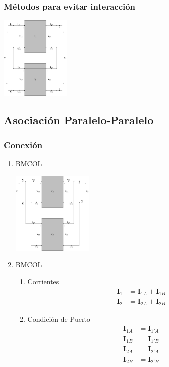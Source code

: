 \subsubsection{Métodos para evitar interacción}
\label{sec:org7265967}
\begin{center}
\includegraphics[height=4cm]{../figs/serie-serie-corto.pdf}
\end{center}

\subsection{Asociación Paralelo-Paralelo}
\label{sec:org3afa958}
\subsubsection{Conexión}
\label{sec:org39169d7}
\begin{enumerate}
\item \hfill{}\textsc{BMCOL}
\label{sec:org8edd165}
\begin{center}
\includegraphics[height=4cm]{../figs/paralelo-paralelo.pdf}
\end{center}
\item \hfill{}\textsc{BMCOL}
\label{sec:orgc8c6f3c}
\begin{enumerate}
\item Corrientes
\label{sec:orgb710c53}
\begin{align*}
  \mathbf{I}_1 &= \mathbf{I}_{1A} + \mathbf{I}_{1B}\\
  \mathbf{I}_2 &= \mathbf{I}_{2A} + \mathbf{I}_{2B}
\end{align*}

\item Condición de Puerto
\label{sec:orgf90580b}
\begin{align*}
  \mathbf{I}_{1A} &= \mathbf{I}_{1'A}\\
  \mathbf{I}_{1B} &= \mathbf{I}_{1'B}\\
  \mathbf{I}_{2A} &= \mathbf{I}_{2'A}\\
  \mathbf{I}_{2B} &= \mathbf{I}_{2'B}
\end{align*}
\end{enumerate}
\end{enumerate}

